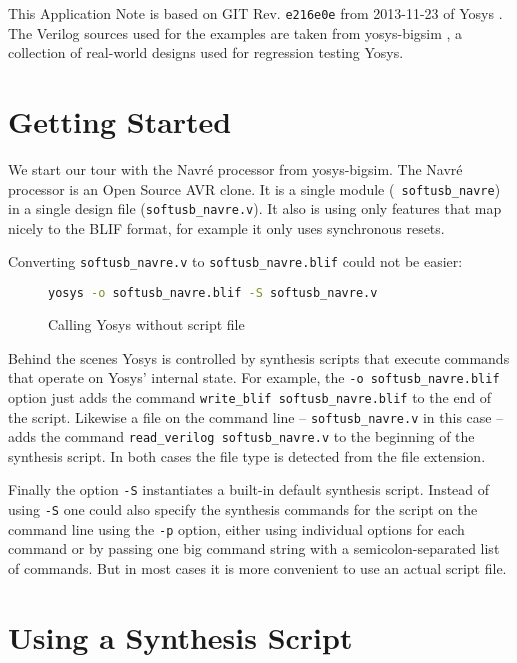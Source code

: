 \documentclass[9pt,technote,a4paper]{IEEEtran}
\begin{document}
\bigskip

This Application Note is based on GIT Rev. {\tt e216e0e} from 2013-11-23 of
Yosys \cite{yosys}. The Verilog sources used for the examples are taken from
yosys-bigsim \cite{bigsim}, a collection of real-world designs used for
regression testing Yosys.

\section{Getting Started}

We start our tour with the Navr\'e processor from yosys-bigsim. The Navr\'e
processor \cite{navre} is an Open Source AVR clone. It is a single module ({\tt
softusb\_navre}) in a single design file ({\tt softusb\_navre.v}). It also is
using only features that map nicely to the BLIF format, for example it only
uses synchronous resets.

Converting {\tt softusb\_navre.v} to {\tt softusb\_navre.blif} could not be
easier:

\begin{figure}[H]
\begin{lstlisting}[language=sh]
yosys -o softusb_navre.blif -S softusb_navre.v
\end{lstlisting}
 \renewcommand{\figurename}{Listing}
\caption{Calling Yosys without script file}
\end{figure}

Behind the scenes Yosys is controlled by synthesis scripts that execute
commands that operate on Yosys' internal state. For example, the {\tt -o
softusb\_navre.blif} option just adds the command {\tt write\_blif
softusb\_navre.blif} to the end of the script. Likewise a file on the
command line -- {\tt softusb\_navre.v} in this case -- adds the command
{\tt read\_verilog softusb\_navre.v} to the beginning of the
synthesis script. In both cases the file type is detected from the
file extension.

Finally the option {\tt -S} instantiates a built-in default synthesis script.
Instead of using {\tt -S} one could also specify the synthesis commands
for the script on the command line using the {\tt -p} option, either using
individual options for each command or by passing one big command string
with a semicolon-separated list of commands. But in most cases it is more
convenient to use an actual script file.

\section{Using a Synthesis Script}
\end{document}
